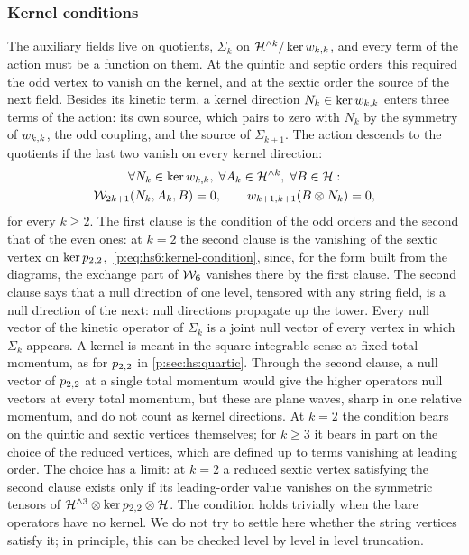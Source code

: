 \subsubsection{Kernel conditions}
\label{pc:sec:all:kernel}

The auxiliary fields live on quotients, $\Sigma_k$ on $\mathcal{H}^{\wedge k} / \ker w_{k,k}$, and every term of the action must be a function on them.
At the quintic and septic orders this required the odd vertex to vanish on the kernel, and at the sextic order the source of the next field.
Besides its kinetic term, a kernel direction $N_k \in \ker w_{k,k}$ enters three terms of the action: its own source, which pairs to zero with $N_k$ by the symmetry of $w_{k,k}$, the odd coupling, and the source of $\Sigma_{k + 1}$.
The action descends to the quotients if the last two vanish on every kernel direction:
\begin{equation}
  \label{pc:eq:all:kernel-condition}
  \begin{gathered}
    \forall N_k \in \ker w_{k,k}, \;
    \forall A_k \in \mathcal{H}^{\wedge k}, \;
    \forall B \in \mathcal{H}:
    \\
    \mathcal{W}_{2 k + 1}(N_k, A_k, B)
      = 0,
    \qquad
    w_{k + 1,k + 1}(B \otimes N_k)
      = 0,
  \end{gathered}
\end{equation}
for every $k \ge 2$.
The first clause is the condition of the odd orders and the second that of the even ones: at $k = 2$ the second clause is the vanishing of the sextic vertex on $\ker p_{2,2}$,~\eqref{p:eq:hs6:kernel-condition}, since, for the form built from the diagrams, the exchange part of $\mathcal{W}_{6}$ vanishes there by the first clause.
The second clause says that a null direction of one level, tensored with any string field, is a null direction of the next: null directions propagate up the tower.
Every null vector of the kinetic operator of $\Sigma_k$ is a joint null vector of every vertex in which $\Sigma_k$ appears.
A kernel is meant in the square-integrable sense at fixed total momentum, as for $p_{2,2}$ in \cref{p:sec:hs:quartic}.
Through the second clause, a null vector of $p_{2,2}$ at a single total momentum would give the higher operators null vectors at every total momentum, but these are plane waves, sharp in one relative momentum, and do not count as kernel directions.
At $k = 2$ the condition bears on the quintic and sextic vertices themselves; for $k \ge 3$ it bears in part on the choice of the reduced vertices, which are defined up to terms vanishing at leading order.
The choice has a limit: at $k = 2$ a reduced sextic vertex satisfying the second clause exists only if its leading-order value vanishes on the symmetric tensors of $\mathcal{H}^{\wedge 3} \otimes \ker p_{2,2} \otimes \mathcal{H}$.
The condition holds trivially when the bare operators have no kernel.
We do not try to settle here whether the string vertices satisfy it; in principle, this can be checked level by level in level truncation.

